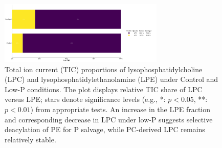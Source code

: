 \documentclass[10pt,letterpaper]{article}
\begin{document}
\begin{figure}[htp]
  \centering
  \includegraphics[width=0.7\textwidth]{fig/supp/SuppFig_5_TIC_LPC_LPE.png}
  \caption{Total ion current (TIC) proportions of lysophosphatidylcholine (LPC) and lysophosphatidylethanolamine (LPE) under Control and Low-P conditions. The plot displays relative TIC share of LPC versus LPE; stars denote significance levels (e.g., *: $p<0.05$, **: $p<0.01$) from appropriate tests. An increase in the LPE fraction and corresponding decrease in LPC under low-P suggests selective deacylation of PE for P salvage, while PC-derived LPC remains relatively stable.}
  \label{fig:S5_TIC_LPC_LPE}
\end{figure}
\end{document}
